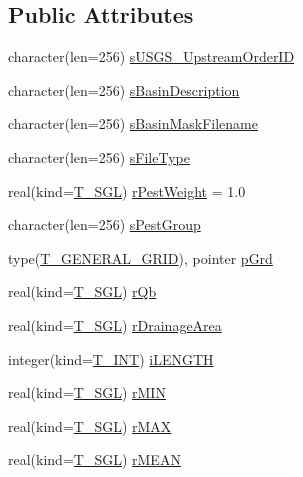 \subsection*{Public Attributes}
\begin{DoxyCompactItemize}
\item 
character(len=256) \hyperlink{typetest_1_1_t___b_a_s_i_n___m_a_s_k_accb8e95cae462040d538efea1871a7c6}{sUSGS\_\-UpstreamOrderID}
\item 
character(len=256) \hyperlink{typetest_1_1_t___b_a_s_i_n___m_a_s_k_ab83349c9e0bb48c0ccd4a7753f413ac5}{sBasinDescription}
\item 
character(len=256) \hyperlink{typetest_1_1_t___b_a_s_i_n___m_a_s_k_a008875fe4bfe1fd8b563f93352959a18}{sBasinMaskFilename}
\item 
character(len=256) \hyperlink{typetest_1_1_t___b_a_s_i_n___m_a_s_k_a3c9ab13aa853a845ec98fa82fd0365fe}{sFileType}
\item 
real(kind=\hyperlink{namespacetest_a04d8b9090502de3a00046fe904bc3d99}{T\_\-SGL}) \hyperlink{typetest_1_1_t___b_a_s_i_n___m_a_s_k_a5398f17e54adaecac9bebfccd65d71fb}{rPestWeight} = 1.0
\item 
character(len=256) \hyperlink{typetest_1_1_t___b_a_s_i_n___m_a_s_k_a7d374526df390b7d1e8debc8122e54ca}{sPestGroup}
\item 
type(\hyperlink{typetest_1_1_t___g_e_n_e_r_a_l___g_r_i_d}{T\_\-GENERAL\_\-GRID}), pointer \hyperlink{typetest_1_1_t___b_a_s_i_n___m_a_s_k_a445aa988a4cfc4b2f0c5c6edf2f9aeb0}{pGrd}
\item 
real(kind=\hyperlink{namespacetest_a04d8b9090502de3a00046fe904bc3d99}{T\_\-SGL}) \hyperlink{typetest_1_1_t___b_a_s_i_n___m_a_s_k_a70edd292207574b623182d89d64a2ad1}{rQb}
\item 
real(kind=\hyperlink{namespacetest_a04d8b9090502de3a00046fe904bc3d99}{T\_\-SGL}) \hyperlink{typetest_1_1_t___b_a_s_i_n___m_a_s_k_a2c9ca5d8db32aa7a6716714e41904aaf}{rDrainageArea}
\item 
integer(kind=\hyperlink{namespacetest_a6f91ebd89b58cfcc5da99faed9385c1e}{T\_\-INT}) \hyperlink{typetest_1_1_t___b_a_s_i_n___m_a_s_k_a30fd77abc485e4251ed9c7bc001f96a4}{iLENGTH}
\item 
real(kind=\hyperlink{namespacetest_a04d8b9090502de3a00046fe904bc3d99}{T\_\-SGL}) \hyperlink{typetest_1_1_t___b_a_s_i_n___m_a_s_k_a62e7fb67c49d4898b95a2bfd495cae86}{rMIN}
\item 
real(kind=\hyperlink{namespacetest_a04d8b9090502de3a00046fe904bc3d99}{T\_\-SGL}) \hyperlink{typetest_1_1_t___b_a_s_i_n___m_a_s_k_a526fcca78de92793975fe6c363854507}{rMAX}
\item 
real(kind=\hyperlink{namespacetest_a04d8b9090502de3a00046fe904bc3d99}{T\_\-SGL}) \hyperlink{typetest_1_1_t___b_a_s_i_n___m_a_s_k_a52a3447734db74c1a98ac0af73f1383f}{rMEAN}
\end{DoxyCompactItemize}


